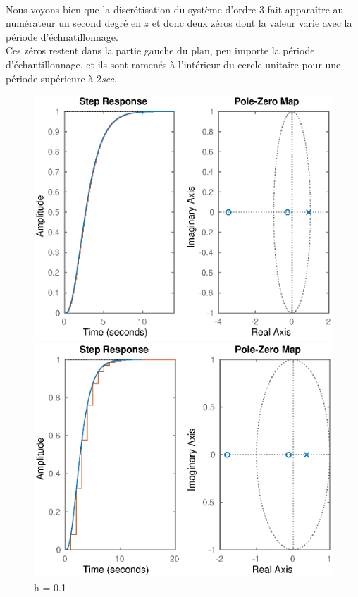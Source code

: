 \paragraph{}
Nous voyons bien que la discrétisation du système d'ordre 3 fait apparaître au numérateur un second degré en $z$ et donc deux zéros dont la valeur varie avec la période d'échnatillonnage.
\\Ces zéros restent dans la partie gauche du plan, peu importe la période d'échantillonnage, et ils sont ramenés à l'intérieur du cercle unitaire pour une période supérieure à 2\textit{sec}.
\begin{figure}[!h]  
  \begin{minipage}[b]{0.5\linewidth}
    \includegraphics[width=1\linewidth]{eps/labo1-ordre3-0-1} 
    \caption{h = 0.1} 
    \vspace{4ex}
  \end{minipage}%
  \begin{minipage}[b]{0.5\linewidth}
    \centering
    \includegraphics[width=1\linewidth]{eps/labo1-ordre3-1} 

\end{minipage}
\end{figure}
